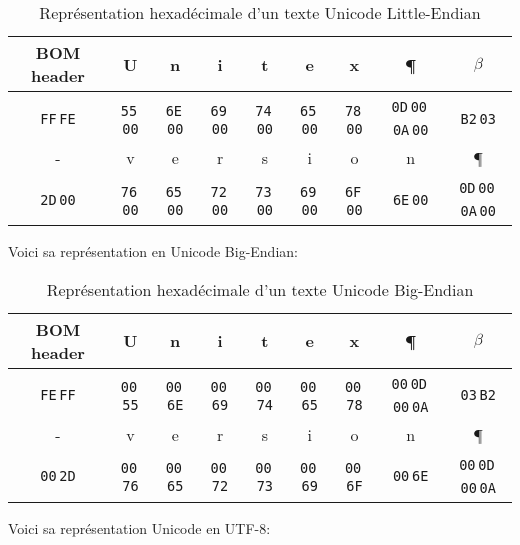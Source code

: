 \bigskip
\begin{table}[!ht]
\begin{center}
\begin{tabular}{|c|c|c|c|c|c|c|c|c|}
\hline
BOM header & U & n & i & t & e & x & \P & $\beta$
\\
\hline
\verb+FF+\,\verb+FE+ & \verb+55+\,\verb+00+ & \verb+6E+\,\verb+00+ & \verb+69+\,\verb+00+ & \verb+74+\,\verb+00+ & \verb+65+\,\verb+00+ & \verb+78+\,\verb+00+
& \verb+0D+\,\verb+00+\,\verb+0A+\,\verb+00+ & \verb+B2+\,\verb+03+
\\
\hline
\hline
- & v & e & r & s & i & o & n & \P
\\
\hline
\verb+2D+\,\verb+00+ & \verb+76+\,\verb+00+ & \verb+65+\,\verb+00+ & \verb+72+\,\verb+00+ & \verb+73+\,\verb+00+ & \verb+69+\,\verb+00+ & \verb+6F+\,\verb+00+
& \verb+6E+\,\verb+00+ & \verb+0D+\,\verb+00+\,\verb+0A+\,\verb+00+
\\
\hline
\end{tabular}
\caption{Représentation hexadécimale d’un texte Unicode Little-Endian}
\end{center}
\end{table}
\pagebreak
\bigskip
\noindent Voici sa représentation en Unicode Big-Endian:

\bigskip
\begin{table}[!ht]
\begin{center}
\begin{tabular}{|c|c|c|c|c|c|c|c|c|}
\hline
BOM header & U & n & i & t & e & x & \P & $\beta$
\\
\hline
\verb+FE+\,\verb+FF+ & \verb+00+\,\verb+55+ & \verb+00+\,\verb+6E+ & \verb+00+\,\verb+69+ & \verb+00+\,\verb+74+ & \verb+00+\,\verb+65+ & \verb+00+\,\verb+78+
& \verb+00+\,\verb+0D+\,\verb+00+\,\verb+0A+ & \verb+03+\,\verb+B2+
\\
\hline
\hline
- & v & e & r & s & i & o & n & \P
\\
\hline
\verb+00+\,\verb+2D+ & \verb+00+\,\verb+76+ & \verb+00+\,\verb+65+ & \verb+00+\,\verb+72+ & \verb+00+\,\verb+73+ & \verb+00+\,\verb+69+ & \verb+00+\,\verb+6F+
& \verb+00+\,\verb+6E+ & \verb+00+\,\verb+0D+\,\verb+00+\,\verb+0A+
\\
\hline
\end{tabular}
\caption{Représentation hexadécimale d’un texte Unicode Big-Endian}
\end{center}
\end{table}

\bigskip
\noindent Voici sa représentation Unicode en UTF-8:

